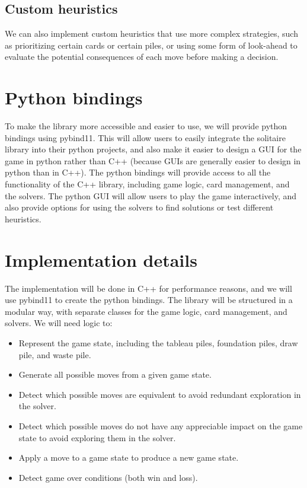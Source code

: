 \documentclass[11pt]{article}
\begin{document}
\subsection{Custom heuristics}
We can also implement custom heuristics that use more complex strategies, such as prioritizing certain cards or certain piles, or using some form of look-ahead to evaluate the potential consequences of each move before making a decision.

\section{Python bindings}

To make the library more accessible and easier to use, we will provide python bindings using pybind11.
This will allow users to easily integrate the solitaire library into their python projects, and also make it easier to design a GUI for the game in python rather than C++ (because GUIs are generally easier to design in python than in C++).
The python bindings will provide access to all the functionality of the C++ library, including game logic, card management, and the solvers.
The python GUI will allow users to play the game interactively, and also provide options for using the solvers to find solutions or test different heuristics.

\section{Implementation details}

The implementation will be done in C++ for performance reasons, and we will use pybind11 to create the python bindings.
The library will be structured in a modular way, with separate classes for the game logic, card management, and solvers.
We will need logic to:
\begin{itemize}
    \item Represent the game state, including the tableau piles, foundation piles, draw pile, and waste pile.
    \item Generate all possible moves from a given game state.
    \item Detect which possible moves are equivalent to avoid redundant exploration in the solver.
    \item Detect which possible moves do not have any appreciable impact on the game state to avoid exploring them in the solver.
    \item Apply a move to a game state to produce a new game state.
    \item Detect game over conditions (both win and loss).
\end{itemize}
\end{document}
